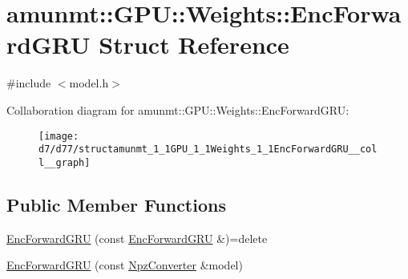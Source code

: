 \hypertarget{structamunmt_1_1GPU_1_1Weights_1_1EncForwardGRU}{}\section{amunmt\+:\+:G\+PU\+:\+:Weights\+:\+:Enc\+Forward\+G\+RU Struct Reference}
\label{structamunmt_1_1GPU_1_1Weights_1_1EncForwardGRU}


{\ttfamily \#include $<$model.\+h$>$}



Collaboration diagram for amunmt\+:\+:G\+PU\+:\+:Weights\+:\+:Enc\+Forward\+G\+RU\+:
\nopagebreak
\begin{figure}[H]
\begin{center}
\leavevmode
\texttt{[image: d7/d77/structamunmt\_1\_1GPU\_1\_1Weights\_1\_1EncForwardGRU\_\_coll\_\_graph]}
\end{center}
\end{figure}
\subsection*{Public Member Functions}
\begin{DoxyCompactItemize}
\item 
\hyperlink{structamunmt_1_1GPU_1_1Weights_1_1EncForwardGRU_a87249c40493ec68b1556e43b5c2ecc81}{Enc\+Forward\+G\+RU} (const \hyperlink{structamunmt_1_1GPU_1_1Weights_1_1EncForwardGRU}{Enc\+Forward\+G\+RU} \&)=delete
\item 
\hyperlink{structamunmt_1_1GPU_1_1Weights_1_1EncForwardGRU_a7c2085696488a629ddcbec4da54caf3e}{Enc\+Forward\+G\+RU} (const \hyperlink{classamunmt_1_1GPU_1_1NpzConverter}{Npz\+Converter} \&model)
\end{DoxyCompactItemize}
